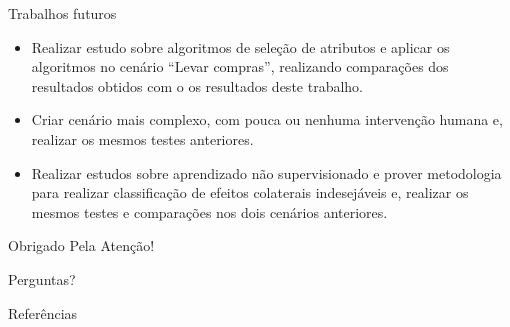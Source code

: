 \documentclass[brazil]{beamer}
\begin{document}
\begin{frame}{Trabalhos futuros}
   \begin{itemize}
\justifying
      \item <1 ->Realizar estudo sobre algoritmos de seleção de atributos e aplicar os algoritmos no cenário ``Levar compras'', realizando comparações dos resultados obtidos com o os resultados deste trabalho.
      \item <2 ->Criar cenário mais complexo, com pouca ou nenhuma intervenção humana e, realizar os mesmos testes anteriores.
      \item <3 ->Realizar estudos sobre aprendizado não supervisionado e prover metodologia para realizar classificação de efeitos colaterais indesejáveis e, realizar os mesmos testes e comparações nos dois cenários anteriores.
   \end{itemize}
\end{frame}

\begin{frame}{}
\centering
\huge{Obrigado Pela Atenção!}
\end{frame}

\begin{frame}{}
\centering
\huge{Perguntas?}
\end{frame}


\begin{frame}[allowframebreaks]{Referências}
  
\end{frame}
\end{document}
